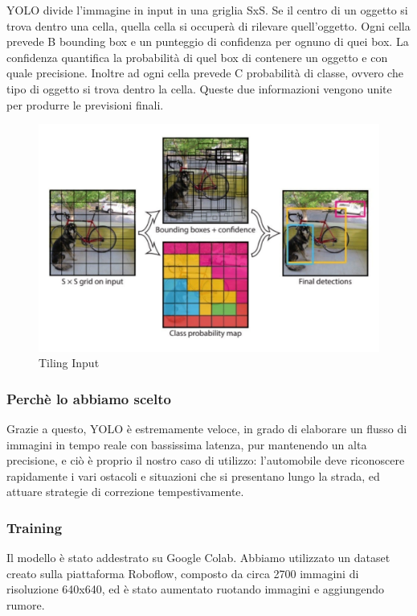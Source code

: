 \documentclass{article}
\begin{document}
\newpage
YOLO divide l'immagine in input in una griglia SxS. Se il centro di un oggetto si trova dentro una cella, quella cella si occuperà di rilevare quell'oggetto.
Ogni cella prevede B bounding box e un punteggio di confidenza per ognuno di quei box. La confidenza quantifica la probabilità di quel box di contenere un oggetto e con quale precisione. Inoltre ad ogni cella prevede C probabilità di classe, ovvero che tipo di oggetto si trova dentro la cella. 
Queste due informazioni vengono unite per produrre le previsioni finali.

\begin{figure}[h!]
    \centering
    \includegraphics[width=0.8\linewidth]{cf.jpg}
    \caption{Tiling Input}
\end{figure}

\subsubsection{Perchè lo abbiamo scelto}
Grazie a questo, YOLO è estremamente veloce, in grado di elaborare un flusso di immagini in tempo reale con bassissima latenza, pur mantenendo un alta precisione, e ciò è proprio il nostro caso di utilizzo: l'automobile deve riconoscere rapidamente i vari ostacoli e situazioni che si presentano lungo la strada, ed attuare strategie di correzione tempestivamente.

\subsubsection{Training}

  Il modello è stato addestrato su Google Colab.
  Abbiamo utilizzato un dataset creato sulla piattaforma Roboflow, composto da circa 2700 immagini di risoluzione 640x640, ed è stato aumentato ruotando immagini e aggiungendo rumore.
  
\end{document}
